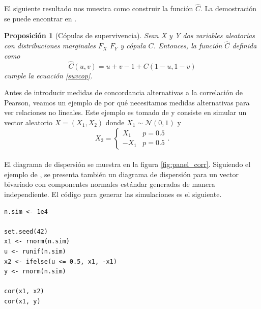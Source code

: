 \documentclass[11pt,a4paper]{article}
\newtheorem{proposition}{Proposición}[subsection]
\begin{document}
El siguiente resultado nos muestra como construir la función $\widehat{C}$. La demostración se puede encontrar en \citet{nelsen}.\\

\begin{proposition}[Cópulas de supervivencia]
\label{def_cop_surv}
Sean X y Y dos variables aleatorias con distribuciones marginales $F_X$ $F_Y$ y cópula $C$. Entonces, la función $\widehat{C}$ definida como $$\widehat{C}(u, v) = u + v - 1 + C(1-u, 1-v)$$ cumple la ecuación \eqref{suvcop}.\\
\end{proposition}

Antes de introducir medidas de concordancia alternativas a la correlación de Pearson, veamos un ejemplo de por qué necesitamos medidas alternativas para ver relaciones no lineales. Este ejemplo es tomado de \citet{copula_modeling} y consiste en simular un vector aleatorio $X = (X_1, X_2)$ donde $X_1 \sim \mathcal{N}(0, 1)$ y $$X_2 = \begin{cases}
X_1 & p = 0.5\\
-X_1 & p = 0.5
\end{cases}.$$\\

El diagrama de dispersión se muestra en la figura \ref{fig:panel_corr}. Siguiendo el ejemplo de \citet{copula_modeling}, se presenta también un diagrama de dispersión para un vector bivariado con componentes normales estándar generadas de manera independiente. El código para generar las simulaciones es el siguiente.\\

\begin{lstlisting}
n.sim <- 1e4

set.seed(42)
x1 <- rnorm(n.sim)
u <- runif(n.sim)
x2 <- ifelse(u <= 0.5, x1, -x1)
y <- rnorm(n.sim)

cor(x1, x2)
cor(x1, y)
\end{lstlisting}
\end{document}
